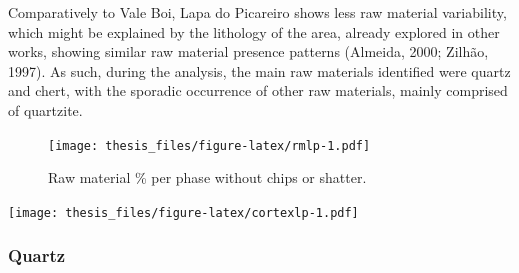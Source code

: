 \documentclass[12pt,twoside]{reedthesis}
\begin{document}
Comparatively to Vale Boi, Lapa do Picareiro shows less raw material variability, which might be explained by the lithology of the area, already explored in other works, showing similar raw material presence patterns (Almeida, 2000; Zilhão, 1997). As such, during the analysis, the main raw materials identified were quartz and chert, with the sporadic occurrence of other raw materials, mainly comprised of quartzite.
\begin{figure}
\centering
\texttt{[image: thesis\_files/figure-latex/rmlp-1.pdf]}
\caption{\label{fig:rmlp}Raw material \% per phase without chips or shatter.}
\end{figure}
\texttt{[image: thesis\_files/figure-latex/cortexlp-1.pdf]}
\begin{table}

\caption{\label{tab:cortextabtg}Cortex type and localization by raw material (Terminal Gravettian).}
\centering
{}
\end{table}
\begin{table}

\caption{\label{tab:cortextabpr}Cortex type and localization by raw material (Proto-Solutrean).}
\centering
{}
\end{table}
\hypertarget{quartz-1}{%
\subsubsection{Quartz}\label{quartz-1}}
\end{document}
